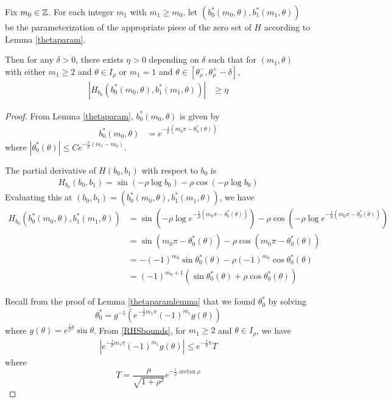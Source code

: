 \documentclass[thesis.tex]{subfiles}
\begin{document}
\begin{lemma}\label{Hderivboundslemma}
Fix $m_0 \in {\mathbb Z}$. For each integer $m_1$ with $m_1 \geq m_0$, let $(b_0^*(m_0, \theta), b_1^*(m_1, \theta))$ be the parameterization of the appropriate piece of the zero set of $H$ according to Lemma \ref{thetaparam}. 

Then for any $\delta > 0$, there exists $\eta > 0$ depending on $\delta$ such that for $(m_1, \theta)$ with either $m_1 \geq 2$ and $\theta \in I_\rho$ or $m_1 = 1$ and $\theta \in [\theta_\rho^-, \theta_\rho^+ - \delta]$,
\begin{align}\label{Hderivbound}
| H_{b_0}(b_0^*(m_0, \theta), b_1^*(m_1, \theta)) | &\geq \eta
\end{align}

\begin{proof}
From Lemma \ref{thetaparam}, $b_0^*(m_0, \theta)$ is given by
\begin{align}\label{b0starexp}
b_0^*(m_0, \theta) &= e^{-\frac{1}{\rho}(m_0 \pi - \theta_0^*(\theta)) }
\end{align}
where $|\theta_0^*(\theta)| \leq C e^{ -\frac{\pi}{\rho}(m_1 - m_0)}$.

The partial derivative of $H(b_0, b_1)$ with respect to $b_0$ is
\begin{align}\label{Hb0}
H_{b_0} (b_0, b_1) = \sin(-\rho \log b_0) - \rho \cos(-\rho \log b_0)
\end{align}
Evaluating this at $(b_0, b_1) = (b_0^*(m_0, \theta), b_1^*(m_1, \theta))$, we have 
\begin{align*}
H_{b_0}(b_0^*(m_0, \theta), b_1^*(m_1, \theta)) &= \sin\left(-\rho \log e^{-\frac{1}{\rho}(m_0 \pi - \theta_0^*(\theta))} \right) - \rho \cos\left(-\rho \log e^{-\frac{1}{\rho}(m_0 \pi - \theta_0^*(\theta))} \right) \\
&= \sin\left(m_0 \pi - \theta_0^*(\theta) \right) - \rho \cos\left(m_0 \pi - \theta_0^*(\theta) \right) \\
&= -(-1)^{m_0} \sin \theta_0^*(\theta) - \rho (-1)^{m_0} \cos \theta_0^*(\theta) \\
&= (-1)^{m_0+1} \left( \sin \theta_0^*(\theta) + \rho \cos \theta_0^*(\theta) \right)
\end{align*}

Recall from the proof of Lemma \ref{thetaparamlemma} that we found $\theta_0^*$ by solving
\begin{equation*}
\theta_0^* = g^{-1}\left( e^{ -\frac{1}{\rho} m_1 \pi } (-1)^{m_1} g(\theta) \right)
\end{equation*}
where $g(\theta) = e^{ \frac{1}{\rho} \theta } \sin \theta$. From \eqref{RHSbounds}, for $m_1 \geq 2$ and $\theta \in I_\rho$, we have 
\begin{align}\label{RHSboundgeq2}
|e^{ -\frac{1}{\rho} m_1 \pi } (-1)^{m_1} g(\theta)| \leq e^{ -\frac{1}{\rho} \pi } T
\end{align}
where
\begin{equation*}\label{defT}
T = \frac{\rho}{\sqrt{1+\rho^2}}e^{-\frac{1}{\rho}\arctan \rho}
\end{equation*}


\end{proof}
\end{lemma}
\end{document}
